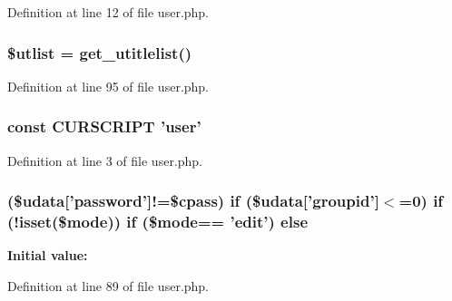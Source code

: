 Definition at line 12 of file user.\+php.

\hypertarget{user_8php_a1fdf35fc8874f8e416efbc37175a4a5b}{
\subsubsection[{\$utlist}]{\setlength{\rightskip}{0pt plus 5cm}\$utlist = {\bf get\+\_\+utitlelist}()}}\label{user_8php_a1fdf35fc8874f8e416efbc37175a4a5b}


Definition at line 95 of file user.\+php.

\hypertarget{user_8php_a39c39f525eceb86cabc338804f230e80}{
\subsubsection[{C\+U\+R\+S\+C\+R\+I\+P\+T}]{\setlength{\rightskip}{0pt plus 5cm}const C\+U\+R\+S\+C\+R\+I\+P\+T 'user'}}\label{user_8php_a39c39f525eceb86cabc338804f230e80}


Definition at line 3 of file user.\+php.

\hypertarget{user_8php_a41373a6e07fe465a99fd5d108c71869c}{
\subsubsection[{else}]{ (\$udata\mbox{[}'password'\mbox{]}!=\$cpass) {\bf if} (\$udata\mbox{[}'groupid'\mbox{]}$<$=0) {\bf if} (!isset(\$mode)) {\bf if} (\$mode== 'edit') else}}\label{user_8php_a41373a6e07fe465a99fd5d108c71869c}
{\bfseries Initial value\+:}


Definition at line 89 of file user.\+php.

